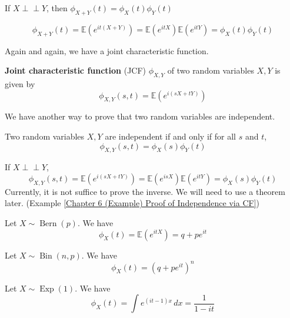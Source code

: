 \documentclass{huhtakm-template-book}
\newcommand{\independent}{\perp\!\!\!\perp}
\newcommand{\expect}{\mathbb{E}}
\DeclareMathOperator{\Bern}{Bern}
\DeclareMathOperator{\Bin}{Bin}
\DeclareMathOperator{\Exp}{Exp}
\begin{document}
\begin{thm}
	If $X\independent Y$, then $\phi_{X+Y}(t)=\phi_{X}(t)\phi_{Y}(t)$
\end{thm}
\begin{proofing}
	\begin{equation*}
		\phi_{X+Y}(t)=\expect(e^{it(X+Y)})=\expect(e^{itX})\expect(e^{itY})=\phi_{X}(t)\phi_{Y}(t)
	\end{equation*}
\end{proofing}
Again and again, we have a joint characteristic function.
\begin{defn}
	\textbf{Joint characteristic function} (JCF) $\phi_{X,Y}$ of two random variables $X,Y$ is given by
	\begin{equation*}
		\phi_{X,Y}(s,t)=\expect(e^{i(sX+tY)})
	\end{equation*}
\end{defn}
We have another way to prove that two random variables are independent.
\begin{thm}
	\label{Chapter 6 (Theorem) Independence via CF}
	Two random variables $X,Y$ are independent if and only if for all $s$ and $t$,
	\begin{equation*}
		\phi_{X,Y}(s,t)=\phi_{X}(s)\phi_{Y}(t)
	\end{equation*}
\end{thm}
\begin{proofing}
	If $X\independent Y$,
	\begin{equation*}
		\phi_{X,Y}(s,t)=\expect(e^{i(sX+tY)})=\expect(e^{isX})\expect(e^{itY})=\phi_{X}(s)\phi_{Y}(t)
	\end{equation*}
	Currently, it is not suffice to prove the inverse. We will need to use a theorem later. (Example \ref{Chapter 6 (Example) Proof of Independence via CF})
\end{proofing}
\begin{eg}
	Let $X\sim\Bern(p)$. We have
	\begin{equation*}
		\phi_{X}(t)=\expect(e^{itX})=q+pe^{it}
	\end{equation*}
\end{eg}
\begin{eg}
	Let $X\sim\Bin(n,p)$. We have
	\begin{equation*}
		\phi_{X}(t)=(q+pe^{it})^{n}
	\end{equation*}
\end{eg}
\begin{eg}
	Let $X\sim\Exp(1)$. We have
	\begin{equation*}
		\phi_{X}(t)=\int e^{(it-1)x}\,dx=\frac{1}{1-it}
	\end{equation*}
\end{eg}
\end{document}
